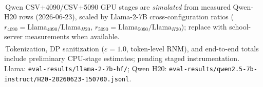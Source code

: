 \begin{table}[t]
\vspace{0.6em}
\begin{minipage}{0.96\textwidth}
\footnotesize
\setlength{\parskip}{0.35em}
\textsuperscript{\dag}\,Qwen CSV+4090/CSV+5090 GPU stages are \emph{simulated} from measured Qwen-H20 rows (2026-06-23), scaled by Llama-2-7B cross-configuration ratios ($r_{4090}=\mathrm{Llama}_{4090}/\mathrm{Llama}_{H20}$, $r_{5090}=\mathrm{Llama}_{5090}/\mathrm{Llama}_{H20}$); replace with school-server measurements when available.\\
\textsuperscript{\ddag}\,Tokenization, DP sanitization ($\varepsilon{=}1.0$, token-level RNM), and end-to-end totals include preliminary CPU-stage estimates; pending staged instrumentation.\\
Llama: \texttt{eval-results/llama-2-7b-hf/}; Qwen H20: \texttt{eval-results/qwen2.5-7b-instruct/H20-20260623-150700.jsonl}.
\end{minipage}
\end{table}
